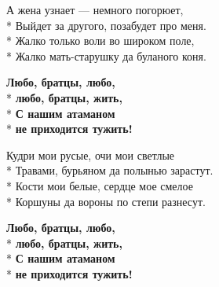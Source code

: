 \medskip

\begin{minipage}{\linewidth}
А жена узнает — немного погорюет,\\*
Выйдет за другого, позабудет про меня.\\*
Жалко только воли во широком поле,\\*
Жалко мать-старушку да буланого коня.\\
\end{minipage}\par\medskip\nobreak

\medskip

\begin{minipage}{\linewidth}
\hspace*{1.5em}\textbf{Любо, братцы, любо,}\\*
\hspace*{1.5em}\textbf{любо, братцы, жить,}\\*
\hspace*{1.5em}\textbf{С нашим атаманом}\\*
\hspace*{1.5em}\textbf{не приходится тужить!}\\
\end{minipage}\par\medskip\nobreak

\medskip

\begin{minipage}{\linewidth}
Кудри мои русые, очи мои светлые\\*
Травами, бурьяном да полынью зарастут.\\*
Кости мои белые, сердце мое смелое\\*
Коршуны да вороны по степи разнесут.\\
\end{minipage}\par\medskip\nobreak

\medskip

\begin{minipage}{\linewidth}
\hspace*{1.5em}\textbf{Любо, братцы, любо,}\\*
\hspace*{1.5em}\textbf{любо, братцы, жить,}\\*
\hspace*{1.5em}\textbf{С нашим атаманом}\\*
\hspace*{1.5em}\textbf{не приходится тужить!}\\
\end{minipage}

